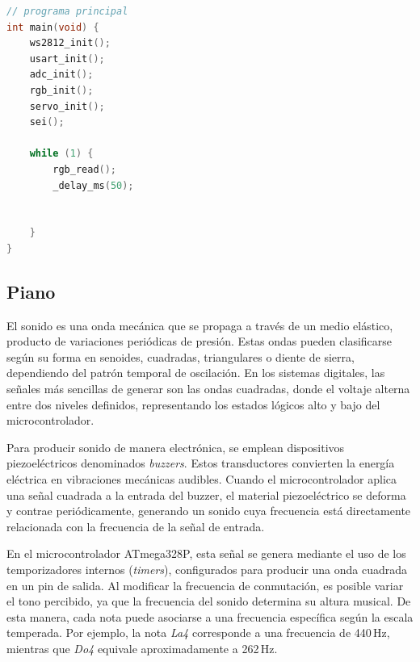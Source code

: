 \begin{lstlisting}[language=C, caption={Bucle principal}]
// programa principal
int main(void) {
	ws2812_init();
	usart_init();
	adc_init();
	rgb_init();
	servo_init();
	sei();
	
	while (1) {
		rgb_read();
		_delay_ms(50);

	
	}
}
\end{lstlisting}













\subsection{Piano}

El sonido es una onda mecánica que se propaga a través de un medio elástico, producto de variaciones periódicas de presión. Estas ondas pueden clasificarse según su forma en senoides, cuadradas, triangulares o diente de sierra, dependiendo del patrón temporal de oscilación. En los sistemas digitales, las señales más sencillas de generar son las ondas cuadradas, donde el voltaje alterna entre dos niveles definidos, representando los estados lógicos alto y bajo del microcontrolador.

\vspace{1em}

Para producir sonido de manera electrónica, se emplean dispositivos piezoeléctricos denominados \textit{buzzers}. Estos transductores convierten la energía eléctrica en vibraciones mecánicas audibles. Cuando el microcontrolador aplica una señal cuadrada a la entrada del buzzer, el material piezoeléctrico se deforma y contrae periódicamente, generando un sonido cuya frecuencia está directamente relacionada con la frecuencia de la señal de entrada.

\vspace{1em}

En el microcontrolador ATmega328P, esta señal se genera mediante el uso de los temporizadores internos (\textit{timers}), configurados para producir una onda cuadrada en un pin de salida. Al modificar la frecuencia de conmutación, es posible variar el tono percibido, ya que la frecuencia del sonido determina su altura musical. De esta manera, cada nota puede asociarse a una frecuencia específica según la escala temperada. Por ejemplo, la nota \textit{La4} corresponde a una frecuencia de 440\,Hz, mientras que \textit{Do4} equivale aproximadamente a 262\,Hz.

